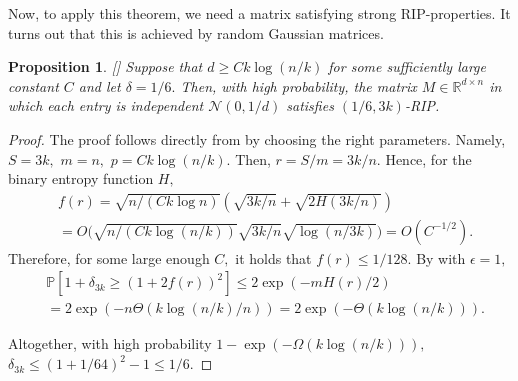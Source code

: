 \documentclass[preprint]{article}
\newtheorem{proposition}{Proposition}[]
\newcommand{\prob}{\mathbb{P}}
\begin{document}
Now, to apply this theorem, we need a matrix satisfying strong RIP-properties. It turns out that this is achieved by random Gaussian matrices. 

\begin{proposition}
\label{prop:candestaogaussianrip}[\cite{CandesTao2005,baraniuk2008simple}]
Suppose that $d\ge Ck\log (n/k)$ for some sufficiently large constant $C$ and let $\delta = 1/6.$ Then, 
with high probability, the matrix $M\in \mathbb{R}^{d\times n}$ in which each entry is independent $\mathcal{N}(0,1/d)$ satisfies
$(1/6,3k)$-RIP.
\end{proposition}
\begin{proof} The proof follows directly from \cite[Lemma 3.1]{CandesTao2005} by choosing the right parameters. Namely, $S = 3k,$ $m = n,$ $p = Ck\log (n/k).$ Then, $r = S/m = 3k/n.$ Hence, for the binary entropy function $H,$
\begin{align*}
& f(r) = \sqrt{n/(Ck\log n)}(\sqrt{3k/n} + \sqrt{2H(3k/n)})\\
& = 
O\Bigg(\sqrt{n/(Ck\log(n/k))} \sqrt{3k/n}\sqrt{\log(n/3k)}\Bigg) = 
O(C^{-1/2}).
\end{align*}
Therefore, for some large enough $C,$ it holds that $f(r)\le 1/128.$ By \cite[Lemma 3.1]{CandesTao2005} with $\epsilon = 1,$
\begin{align*}
    & \prob[1+\delta_{3k}\ge (1 + 2f(r))^2]\le 2\exp(- m H(r)/2)\\
    & = 2\exp(-n \Theta(k\log(n/k)/n)) = 2\exp(-\Theta(k\log(n/k))).
\end{align*}


Altogether, with high probability $1 - \exp(-\Omega(k\log(n/k))),$ $\delta_{3k}\le (1 + 1/64)^2-1\le 1/6.$
\end{proof}
\end{document}
